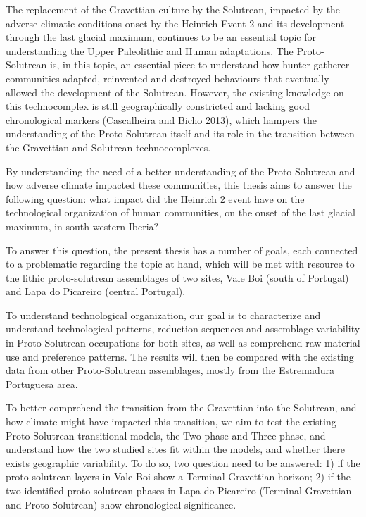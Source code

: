 \documentclass[12pt,twoside]{reedthesis}
\begin{document}
The replacement of the Gravettian culture by the Solutrean, impacted by the adverse climatic conditions onset by the Heinrich Event 2 and its development through the last glacial maximum, continues to be an essential topic for understanding the Upper Paleolithic and Human adaptations. The Proto-Solutrean is, in this topic, an essential piece to understand how hunter-gatherer communities adapted, reinvented and destroyed behaviours that eventually allowed the development of the Solutrean. However, the existing knowledge on this technocomplex is still geographically constricted and lacking good chronological markers (Cascalheira and Bicho 2013), which hampers the understanding of the Proto-Solutrean itself and its role in the transition between the Gravettian and Solutrean technocomplexes.

By understanding the need of a better understanding of the Proto-Solutrean and how adverse climate impacted these communities, this thesis aims to answer the following question: what impact did the Heinrich 2 event have on the technological organization of human communities, on the onset of the last glacial maximum, in south western Iberia?

To answer this question, the present thesis has a number of goals, each connected to a problematic regarding the topic at hand, which will be met with resource to the lithic proto-solutrean assemblages of two sites, Vale Boi (south of Portugal) and Lapa do Picareiro (central Portugal).

To understand technological organization, our goal is to characterize and understand technological patterns, reduction sequences and assemblage variability in Proto-Solutrean occupations for both sites, as well as comprehend raw material use and preference patterns. The results will then be compared with the existing data from other Proto-Solutrean assemblages, mostly from the Estremadura Portuguesa area.

To better comprehend the transition from the Gravettian into the Solutrean, and how climate might have impacted this transition, we aim to test the existing Proto-Solutrean transitional models, the Two-phase and Three-phase, and understand how the two studied sites fit within the models, and whether there exists geographic variability. To do so, two question need to be answered: 1) if the proto-solutrean layers in Vale Boi show a Terminal Gravettian horizon; 2) if the two identified proto-solutrean phases in Lapa do Picareiro (Terminal Gravettian and Proto-Solutrean) show chronological significance.
\end{document}
